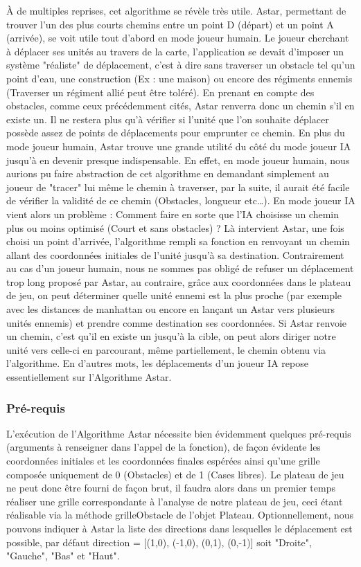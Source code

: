\documentclass{article}
\begin{document}
	À de multiples reprises, cet algorithme se révèle très utile. Astar, permettant de trouver l'un des plus courts chemins entre un point D (départ) et un point A (arrivée), se voit utile tout d'abord en mode joueur humain. Le joueur cherchant à déplacer ses unités au travers de la carte, l'application se devait d'imposer un système "réaliste" de déplacement, c'est à dire sans traverser un obstacle tel qu'un point d'eau, une construction (Ex : une maison) ou encore des régiments ennemis (Traverser un régiment allié peut être toléré). En prenant en compte des obstacles, comme ceux précédemment cités, Astar renverra donc un chemin s'il en existe un. Il ne restera plus qu'à vérifier si l'unité que l'on souhaite déplacer possède assez de points de déplacements pour emprunter ce chemin.
	En plus du mode joueur humain, Astar trouve une grande utilité du côté du mode joueur IA jusqu'à en devenir presque indispensable. En effet, en mode joueur humain, nous aurions pu faire abstraction de cet algorithme en demandant simplement au joueur de "tracer" lui même le chemin à traverser, par la suite, il aurait été facile de vérifier la validité de ce chemin (Obstacles, longueur etc…). En mode joueur IA vient alors un problème : Comment faire en sorte que l'IA choisisse un chemin plus ou moins optimisé (Court et sans obstacles) ? Là intervient Astar, une fois choisi un point d'arrivée, l'algorithme rempli sa fonction en renvoyant un chemin allant des coordonnées initiales de l'unité jusqu'à sa destination. Contrairement au cas d'un joueur humain, nous ne sommes pas obligé de refuser un déplacement trop long proposé par Astar, au contraire, grâce aux coordonnées dans le plateau de jeu, on peut déterminer quelle unité ennemi est la plus proche (par exemple avec les distances de manhattan ou encore en lançant un Astar vers plusieurs unités ennemis) et prendre comme destination ses coordonnées. Si Astar renvoie un chemin, c'est qu'il en existe un jusqu'à la cible, on peut alors diriger notre unité vers celle-ci en parcourant, même partiellement, le chemin obtenu via l'algorithme. En d'autres mots, les déplacements d'un joueur IA repose essentiellement sur l'Algorithme Astar.

 \subsubsection{Pré-requis}

	L’exécution de l'Algorithme Astar nécessite bien évidemment quelques pré-requis (arguments à renseigner dans l'appel de la fonction), de façon évidente les coordonnées initiales et les coordonnées finales espérées ainsi qu'une grille composée uniquement de 0 (Obstacles) et de 1 (Cases libres). Le plateau de jeu ne peut donc être fourni de façon brut, il faudra alors dans un premier temps réaliser une grille correspondante à l'analyse de notre plateau de jeu, ceci étant réalisable via la méthode grilleObstacle de l'objet Plateau. Optionnellement, nous pouvons indiquer à Astar la liste des directions dans lesquelles le déplacement est possible, par défaut direction = [(1,0), (-1,0), (0,1), (0,-1)] soit "Droite", "Gauche", "Bas" et "Haut".
\end{document}
